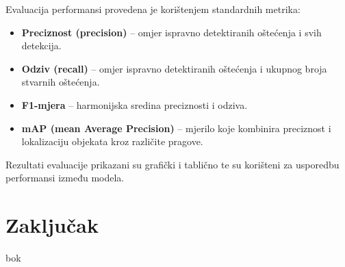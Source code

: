 \documentclass[seminarskirad]{fer}
\begin{document}
Evaluacija performansi provedena je korištenjem standardnih metrika:

\begin{itemize}
    \item \textbf{Preciznost (precision)} – omjer ispravno detektiranih oštećenja i svih detekcija.
    \item \textbf{Odziv (recall)} – omjer ispravno detektiranih oštećenja i ukupnog broja stvarnih oštećenja.
    \item \textbf{F1-mjera} – harmonijska sredina preciznosti i odziva.
    \item \textbf{mAP (mean Average Precision)} – mjerilo koje kombinira preciznost i lokalizaciju objekata kroz različite pragove.
\end{itemize}

Rezultati evaluacije prikazani su grafički i tablično te su korišteni za usporedbu performansi između modela.

\chapter{Zaključak}
\label{pog:zakljucak}

bok \cite{lau2020} \cite{tapamo2023} \cite{nafaa2024} \cite{mdpi2022} \cite{hsieh2024} \cite{guan2023}






\backmatter
\end{document}

